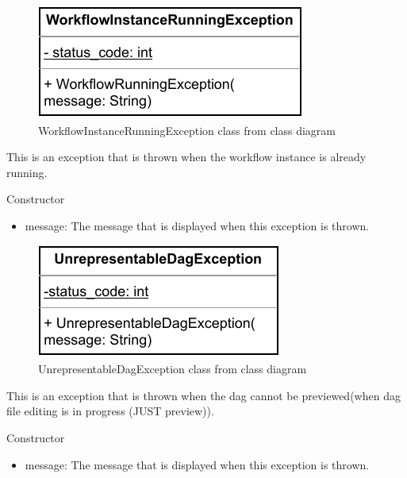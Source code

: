 
\begin{figure}[H]
    \centerline{\includegraphics[scale=1]{res/Klassen/WorkflowInstanceRunningException.pdf}}
    \caption{WorkflowInstanceRunningException class from class diagram}
\end{figure}

This is an exception that is thrown when the workflow instance is already running.
\begin{methodenv}{Constructor}

\begin{itemize}
    \item{message:}
    The message that is displayed when this exception is thrown.
\end{itemize}
\end{methodenv}


\begin{figure}[H]
    \centerline{\includegraphics[scale=1]{res/Klassen/UnrepresentableDagException.pdf}}
    \caption{UnrepresentableDagException class from class diagram}
\end{figure}

This is an exception that is thrown when the dag cannot be previewed(when dag file editing is in progress (JUST preview)).
\begin{methodenv}{Constructor}

\begin{itemize}
    \item{message:}
    The message that is displayed when this exception is thrown.
\end{itemize}
\end{methodenv}